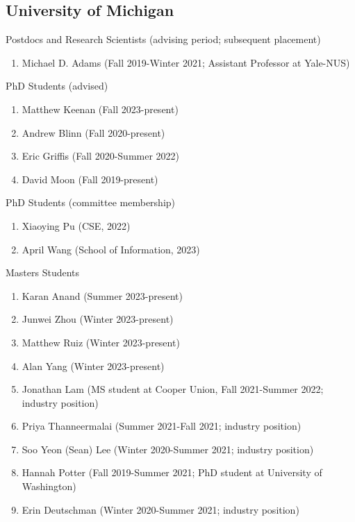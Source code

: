 \documentclass[10pt,letterpaper]{article}
\renewenvironment{itemize}{
  \begin{list}{}{
    \setlength{\leftmargin}{1.25em}
    \setlength{\itemsep}{0.25em}
    \setlength{\parskip}{0pt}
    \setlength{\parsep}{0.2em}
  }
}{
  \end{list}
}
\begin{document}
\subsection*{University of Michigan}
\begin{itemize}
  \item Postdocs and Research Scientists (advising period; subsequent placement)
        \begin{enumerate}
          \item Michael D. Adams (Fall 2019-Winter 2021; Assistant Professor at Yale-NUS)
        \end{enumerate}
  \item PhD Students (advised)
        \begin{enumerate}
          \item Matthew Keenan (Fall 2023-present)
          \item Andrew Blinn (Fall 2020-present)
          \item Eric Griffis (Fall 2020-Summer 2022)
          \item David Moon (Fall 2019-present)
        \end{enumerate}
  \item PhD Students (committee membership)
        \begin{enumerate}
          \item Xiaoying Pu (CSE, 2022)
          \item April Wang (School of Information, 2023)
        \end{enumerate}
  \item Masters Students
        \begin{enumerate}
          \item Karan Anand (Summer 2023-present)
          \item Junwei Zhou (Winter 2023-present)
          \item Matthew Ruiz (Winter 2023-present)
          \item Alan Yang (Winter 2023-present)
          \item Jonathan Lam (MS student at Cooper Union, Fall 2021-Summer 2022; industry position)
          \item Priya Thanneermalai (Summer 2021-Fall 2021; industry position)
          \item Soo Yeon (Sean) Lee (Winter 2020-Summer 2021; industry position)
          \item Hannah Potter (Fall 2019-Summer 2021; PhD student at University of Washington)
          \item Erin Deutschman (Winter 2020-Summer 2021; industry position)

\end{enumerate}
\end{itemize}
\end{document}
